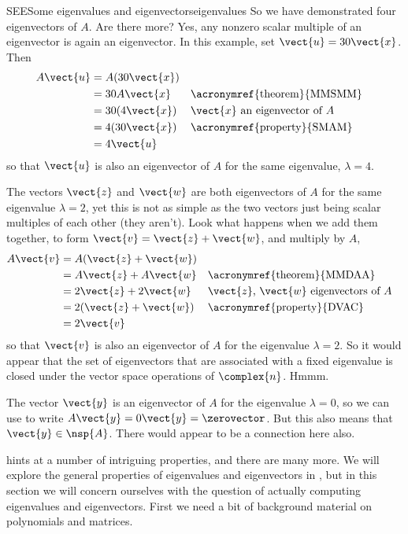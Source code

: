\begin{example}{SEE}{Some eigenvalues and eigenvectors}{eigenvalues}
%
So we have demonstrated four eigenvectors of $A$.  Are there more?  Yes, any nonzero scalar multiple of an eigenvector is again an eigenvector.  In this example, set $\vect{u}=30\vect{x}$.  Then
%
\begin{align*}
A\vect{u}
&=A(30\vect{x})\\
&=30A\vect{x}&&\text{\acronymref{theorem}{MMSMM}}\\
&=30(4\vect{x})&&\text{$\vect{x}$ an eigenvector of $A$}\\
&=4(30\vect{x})&&\text{\acronymref{property}{SMAM}}\\
&=4\vect{u}
\end{align*}
%
so that $\vect{u}$ is also an eigenvector of $A$ for the same eigenvalue, $\lambda=4$.\par
%
The vectors $\vect{z}$ and $\vect{w}$ are both eigenvectors of $A$ for the same eigenvalue $\lambda=2$, yet this is not as simple as the two vectors just being scalar multiples of each other (they aren't).  Look what happens when we add them together, to form $\vect{v}=\vect{z}+\vect{w}$, and multiply by $A$,
%
\begin{align*}
A\vect{v}
&=A(\vect{z}+\vect{w})\\
&=A\vect{z}+A\vect{w}&&\text{\acronymref{theorem}{MMDAA}}\\
&=2\vect{z}+2\vect{w}&&\text{$\vect{z}$, $\vect{w}$ eigenvectors of $A$}\\
&=2(\vect{z}+\vect{w})&&\text{\acronymref{property}{DVAC}}\\
&=2\vect{v}
\end{align*}
%
so that $\vect{v}$ is also an eigenvector of $A$ for the eigenvalue $\lambda=2$.  So it would appear that the set of eigenvectors that are associated with a fixed eigenvalue is closed under the vector space operations of $\complex{n}$.  Hmmm.\par
%
The vector $\vect{y}$ is an eigenvector of $A$ for the eigenvalue $\lambda=0$, so we can use  to write $A\vect{y}=0\vect{y}=\zerovector$.  But this also means that $\vect{y}\in\nsp{A}$.  There would appear to be a connection here also.
%
\end{example}
%
 hints at a number of intriguing properties, and there are many more.  We will explore the general properties of eigenvalues and eigenvectors in , but in this section we will concern ourselves with the question of actually computing eigenvalues and eigenvectors.  First we need a bit of background material on polynomials and matrices.

